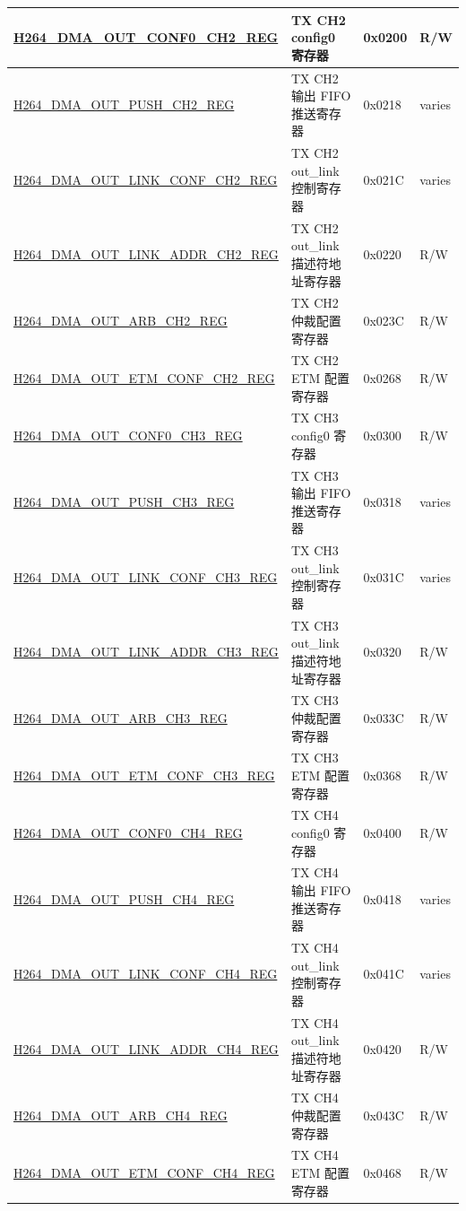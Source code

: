\begin{longtable}{ | p{7.5cm} | p{5.7cm} | p{1.2cm} | p{1cm} | }
    \hyperref[regdesc:H264DMAOUTCONF0CH2REG]{H264\_DMA\_OUT\_CONF0\_CH2\_REG} & TX CH2 config0 寄存器 & 0x0200 & R/W \\ \hline
    \hyperref[regdesc:H264DMAOUTPUSHCH2REG]{H264\_DMA\_OUT\_PUSH\_CH2\_REG} & TX CH2 输出 FIFO 推送寄存器 & 0x0218 & varies \\ \hline
    \hyperref[regdesc:H264DMAOUTLINKCONFCH2REG]{H264\_DMA\_OUT\_LINK\_CONF\_CH2\_REG} & TX CH2 out\_link 控制寄存器 & 0x021C & varies \\ \hline
    \hyperref[regdesc:H264DMAOUTLINKADDRCH2REG]{H264\_DMA\_OUT\_LINK\_ADDR\_CH2\_REG} & TX CH2 out\_link 描述符地址寄存器 & 0x0220 & R/W \\ \hline
    \hyperref[regdesc:H264DMAOUTARBCH2REG]{H264\_DMA\_OUT\_ARB\_CH2\_REG} & TX CH2 仲裁配置寄存器 & 0x023C & R/W \\ \hline
    \hyperref[regdesc:H264DMAOUTETMCONFCH2REG]{H264\_DMA\_OUT\_ETM\_CONF\_CH2\_REG} & TX CH2 ETM 配置寄存器 & 0x0268 & R/W \\ \hline

    \hyperref[regdesc:H264DMAOUTCONF0CH3REG]{H264\_DMA\_OUT\_CONF0\_CH3\_REG} & TX CH3 config0 寄存器 & 0x0300 & R/W \\ \hline
    \hyperref[regdesc:H264DMAOUTPUSHCH3REG]{H264\_DMA\_OUT\_PUSH\_CH3\_REG} & TX CH3 输出 FIFO 推送寄存器 & 0x0318 & varies \\ \hline
    \hyperref[regdesc:H264DMAOUTLINKCONFCH3REG]{H264\_DMA\_OUT\_LINK\_CONF\_CH3\_REG} & TX CH3 out\_link 控制寄存器 & 0x031C & varies \\ \hline
    \hyperref[regdesc:H264DMAOUTLINKADDRCH3REG]{H264\_DMA\_OUT\_LINK\_ADDR\_CH3\_REG} & TX CH3 out\_link 描述符地址寄存器 & 0x0320 & R/W \\ \hline
    \hyperref[regdesc:H264DMAOUTARBCH3REG]{H264\_DMA\_OUT\_ARB\_CH3\_REG} & TX CH3 仲裁配置寄存器 & 0x033C & R/W \\ \hline
    \hyperref[regdesc:H264DMAOUTETMCONFCH3REG]{H264\_DMA\_OUT\_ETM\_CONF\_CH3\_REG} & TX CH3 ETM 配置寄存器 & 0x0368 & R/W \\ \hline

    \hyperref[regdesc:H264DMAOUTCONF0CH4REG]{H264\_DMA\_OUT\_CONF0\_CH4\_REG} & TX CH4 config0 寄存器 & 0x0400 & R/W \\ \hline
    \hyperref[regdesc:H264DMAOUTPUSHCH4REG]{H264\_DMA\_OUT\_PUSH\_CH4\_REG} & TX CH4 输出 FIFO 推送寄存器 & 0x0418 & varies \\ \hline
    \hyperref[regdesc:H264DMAOUTLINKCONFCH4REG]{H264\_DMA\_OUT\_LINK\_CONF\_CH4\_REG} & TX CH4 out\_link 控制寄存器 & 0x041C & varies \\ \hline
    \hyperref[regdesc:H264DMAOUTLINKADDRCH4REG]{H264\_DMA\_OUT\_LINK\_ADDR\_CH4\_REG} & TX CH4 out\_link 描述符地址寄存器 & 0x0420 & R/W \\ \hline
    \hyperref[regdesc:H264DMAOUTARBCH4REG]{H264\_DMA\_OUT\_ARB\_CH4\_REG} & TX CH4 仲裁配置寄存器 & 0x043C & R/W \\ \hline
    \hyperref[regdesc:H264DMAOUTETMCONFCH4REG]{H264\_DMA\_OUT\_ETM\_CONF\_CH4\_REG} & TX CH4 ETM 配置寄存器 & 0x0468 & R/W \\ \hline


\end{longtable}
